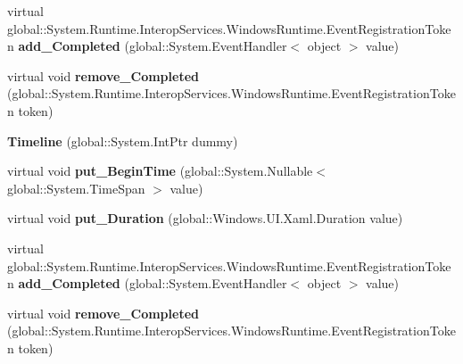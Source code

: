 \begin{DoxyCompactItemize}
virtual global\+::\+System.\+Runtime.\+Interop\+Services.\+Windows\+Runtime.\+Event\+Registration\+Token {\bfseries add\+\_\+\+Completed} (global\+::\+System.\+Event\+Handler$<$ object $>$ value)
\item 
\mbox{\label{class_windows_1_1_u_i_1_1_xaml_1_1_media_1_1_animation_1_1_timeline_abd69089a61fd390f3e7496347cf7afbd}} 
virtual void {\bfseries remove\+\_\+\+Completed} (global\+::\+System.\+Runtime.\+Interop\+Services.\+Windows\+Runtime.\+Event\+Registration\+Token token)
\item 
\mbox{\label{class_windows_1_1_u_i_1_1_xaml_1_1_media_1_1_animation_1_1_timeline_ad9fb777f9fbd5b9e59022ab3cbcde141}} 
{\bfseries Timeline} (global\+::\+System.\+Int\+Ptr dummy)
\item 
\mbox{\label{class_windows_1_1_u_i_1_1_xaml_1_1_media_1_1_animation_1_1_timeline_aae3a485326665861681d7ef24e8bed71}} 
virtual void {\bfseries put\+\_\+\+Begin\+Time} (global\+::\+System.\+Nullable$<$ global\+::\+System.\+Time\+Span $>$ value)
\item 
\mbox{\label{class_windows_1_1_u_i_1_1_xaml_1_1_media_1_1_animation_1_1_timeline_ad18ba23ca70f9feb87ff33751276ed17}} 
virtual void {\bfseries put\+\_\+\+Duration} (global\+::\+Windows.\+U\+I.\+Xaml.\+Duration value)
\item 
\mbox{\label{class_windows_1_1_u_i_1_1_xaml_1_1_media_1_1_animation_1_1_timeline_a06df3c15f47b53c7bde83e2c99016be0}} 
virtual global\+::\+System.\+Runtime.\+Interop\+Services.\+Windows\+Runtime.\+Event\+Registration\+Token {\bfseries add\+\_\+\+Completed} (global\+::\+System.\+Event\+Handler$<$ object $>$ value)
\item 
\mbox{\label{class_windows_1_1_u_i_1_1_xaml_1_1_media_1_1_animation_1_1_timeline_abd69089a61fd390f3e7496347cf7afbd}} 
virtual void {\bfseries remove\+\_\+\+Completed} (global\+::\+System.\+Runtime.\+Interop\+Services.\+Windows\+Runtime.\+Event\+Registration\+Token token)

\end{DoxyCompactItemize}
